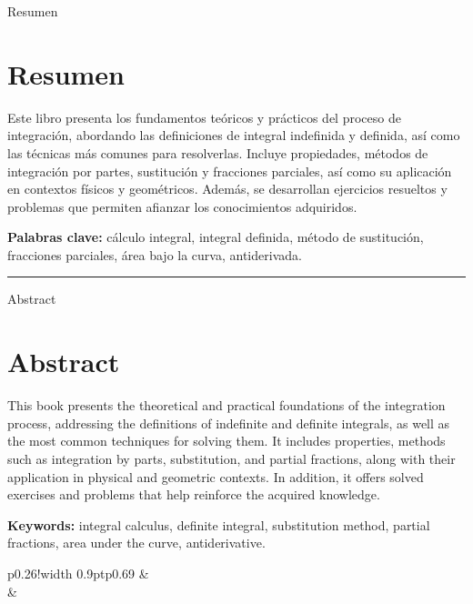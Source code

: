 {\medseries \large Resumen}
\thispagestyle{empty}
\vspace*{1mm}

\chapter*{Resumen}

Este libro presenta los fundamentos teóricos y prácticos del proceso de integración, abordando las definiciones de integral indefinida y definida, así como las técnicas más comunes para resolverlas. Incluye propiedades, métodos de integración por partes, sustitución y fracciones parciales, así como su aplicación en contextos físicos y geométricos. Además, se desarrollan ejercicios resueltos y problemas que permiten afianzar los conocimientos adquiridos.

\textbf{Palabras clave:} cálculo integral, integral definida, método de sustitución, fracciones parciales, área bajo la curva, antiderivada.

\noindent\rule{1.8cm}{0.4pt}
\vspace{1mm}


{\medseries \large Abstract }
\vspace*{1mm}

\chapter*{Abstract}

This book presents the theoretical and practical foundations of the integration process, addressing the definitions of indefinite and definite integrals, as well as the most common techniques for solving them. It includes properties, methods such as integration by parts, substitution, and partial fractions, along with their application in physical and geometric contexts. In addition, it offers solved exercises and problems that help reinforce the acquired knowledge.

\textbf{Keywords:} integral calculus, definite integral, substitution method, partial fractions, area under the curve, antiderivative.

\vspace{1cm}
\begin{tabular}{p{}!{\vrule width 0.9pt}p{0.69\textwidth}}
	& \hspace{2mm}{\medseries \fontsize{11pt}{9pt}\selectfont{¿Como citar este libro?~/ How to cite this book?}} \\[3.5pt]
	& \hangindent=2mm 
	\fontsize{9pt}{9pt}\selectfont{Zambrano Caviedes, J. y Baquero Torres, E. (2025). Problemas resueltos de integración múltiple con aplicaciones en Wolfram Mathematica. Universidad Distrital Francisco José de Caldas-Editorial UD. DOI: XXXX}\\
\end{tabular}